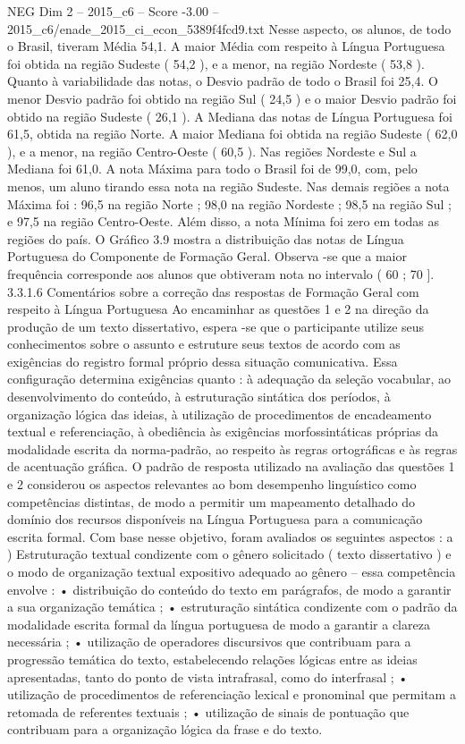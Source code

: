 \begin{textsample}{NEG Dim 2 – 2015\_c6 – Score -3.00 – 2015\_c6/enade\_2015\_ci\_econ\_5389f4fcd9.txt}
Nesse aspecto, os alunos, de todo o Brasil, tiveram Média 54,1.
A maior Média com respeito à Língua Portuguesa foi obtida na região Sudeste ( 54,2 ), e a menor, na região Nordeste ( 53,8 ).
Quanto à variabilidade das notas, o Desvio padrão de todo o Brasil foi 25,4.
O menor Desvio padrão foi obtido na região Sul ( 24,5 ) e o maior Desvio padrão foi obtido na região Sudeste ( 26,1 ).
A Mediana das notas de Língua Portuguesa foi 61,5, obtida na região Norte.
A maior Mediana foi obtida na região Sudeste ( 62,0 ), e a menor, na região Centro-Oeste ( 60,5 ).
Nas regiões Nordeste e Sul a Mediana foi 61,0.
A nota Máxima para todo o Brasil foi de 99,0, com, pelo menos, um aluno tirando essa nota na região Sudeste.
Nas demais regiões a nota Máxima foi : 96,5 na região Norte ; 98,0 na região Nordeste ; 98,5 na região Sul ; e 97,5 na região Centro-Oeste.
Além disso, a nota Mínima foi zero em todas as regiões do país.
O Gráfico 3.9 mostra a distribuição das notas de Língua Portuguesa do Componente de Formação Geral.
Observa -se que a maior frequência corresponde aos alunos que obtiveram nota no intervalo ( 60 ; 70 ]. 3.3.1.6 Comentários sobre a correção das respostas de Formação Geral com respeito à Língua Portuguesa Ao encaminhar as questões 1 e 2 na direção da produção de um texto dissertativo, espera -se que o participante utilize seus conhecimentos sobre o assunto e estruture seus textos de acordo com as exigências do registro formal próprio dessa situação comunicativa.
Essa configuração determina exigências quanto : à adequação da seleção vocabular, ao desenvolvimento do conteúdo, à estruturação sintática dos períodos, à organização lógica das ideias, à utilização de procedimentos de encadeamento textual e referenciação, à obediência às exigências morfossintáticas próprias da modalidade escrita da norma-padrão, ao respeito às regras ortográficas e às regras de acentuação gráfica.
O padrão de resposta utilizado na avaliação das questões 1 e 2 considerou os aspectos relevantes ao bom desempenho linguístico como competências distintas, de modo a permitir um mapeamento detalhado do domínio dos recursos disponíveis na Língua Portuguesa para a comunicação escrita formal.
Com base nesse objetivo, foram avaliados os seguintes aspectos : a ) Estruturação textual condizente com o gênero solicitado ( texto dissertativo ) e o modo de organização textual expositivo adequado ao gênero – essa competência envolve : • distribuição do conteúdo do texto em parágrafos, de modo a garantir a sua organização temática ; • estruturação sintática condizente com o padrão da modalidade escrita formal da língua portuguesa de modo a garantir a clareza necessária ; • utilização de operadores discursivos que contribuam para a progressão temática do texto, estabelecendo relações lógicas entre as ideias apresentadas, tanto do ponto de vista intrafrasal, como do interfrasal ; • utilização de procedimentos de referenciação lexical e pronominal que permitam a retomada de referentes textuais ; • utilização de sinais de pontuação que contribuam para a organização lógica da frase e do texto.

\end{textsample}
